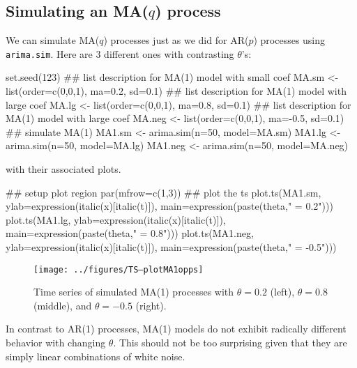 \subsection{Simulating an MA($q$) process}

We can simulate MA($q$) processes just as we did for AR($p$) processes using \texttt{arima.sim}.  Here are 3 different ones with contrasting $\theta$'s:

\begin{Schunk}
\begin{Sinput}
 set.seed(123)
 ## list description for MA(1) model with small coef
 MA.sm <- list(order=c(0,0,1), ma=0.2, sd=0.1)
 ## list description for MA(1) model with large coef
 MA.lg <- list(order=c(0,0,1), ma=0.8, sd=0.1)
 ## list description for MA(1) model with large coef
 MA.neg <- list(order=c(0,0,1), ma=-0.5, sd=0.1)
 ## simulate MA(1)
 MA1.sm <- arima.sim(n=50, model=MA.sm)
 MA1.lg <- arima.sim(n=50, model=MA.lg)
 MA1.neg <- arima.sim(n=50, model=MA.neg)
\end{Sinput}
\end{Schunk}

\noindent with their associated plots.

\begin{Schunk}
\begin{Sinput}
 ## setup plot region
 par(mfrow=c(1,3))
 ## plot the ts
 plot.ts(MA1.sm,
         ylab=expression(italic(x)[italic(t)]),
         main=expression(paste(theta," = 0.2")))
 plot.ts(MA1.lg,
         ylab=expression(italic(x)[italic(t)]),
         main=expression(paste(theta," = 0.8")))
 plot.ts(MA1.neg,
         ylab=expression(italic(x)[italic(t)]),
         main=expression(paste(theta," = -0.5")))
\end{Sinput}
\end{Schunk}

\begin{figure}[htp]
\begin{center}
\texttt{[image: ../figures/TS--plotMA1opps]}
\end{center}
\caption{Time series of simulated MA(1) processes with $\theta=0.2$ (left), $\theta=0.8$ (middle), and $\theta=-0.5$ (right).}
\label{fig:LW1.MA1comp}
\end{figure}

In contrast to AR(1) processes, MA(1) models do not exhibit radically different behavior with changing $\theta$.  This should not be too surprising given that they are simply linear combinations of white noise.


